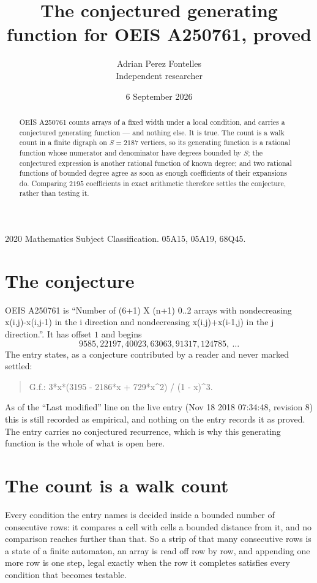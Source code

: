 \documentclass[11pt,a4paper]{article}
\title{The conjectured generating function for OEIS A250761, proved}
\author{Adrian Perez Fontelles\\ \small Independent researcher}
\date{6 September 2026}
\theoremstyle{plain}
\theoremstyle{definition}
\begin{document}
\maketitle

\begin{abstract}
OEIS A250761 counts arrays of a fixed width under a local condition, and carries a conjectured
generating function --- and nothing else. It is true. The count is a walk count in a finite
digraph on $S=2187$ vertices, so its generating function is a rational function whose numerator
and denominator have degrees bounded by $S$; the conjectured expression is another rational
function of known degree; and two rational functions of bounded degree agree as soon as enough
coefficients of their expansions do. Comparing $2195$ coefficients in exact arithmetic
therefore settles the conjecture, rather than testing it.
\end{abstract}

\noindent\small 2020 Mathematics Subject Classification. 05A15, 05A19, 68Q45.\normalsize

\section{The conjecture}

OEIS A250761 is ``Number of (6+1) X (n+1) 0..2 arrays with nondecreasing x(i,j)-x(i,j-1) in the i direction and nondecreasing x(i,j)+x(i-1,j) in the j direction.''. It has offset $1$ and begins
\[
9585, 22197, 40023, 63063, 91317, 124785,\ \dots
\]
The entry states, as a conjecture contributed by a reader and never marked settled:
\begin{quote}
G.f.: 3*x*(3195 - 2186*x + 729*x\^{}2) / (1 - x)\^{}3.
\end{quote}
As of the ``Last modified'' line on the live entry (Nov 18 2018 07:34:48, revision 8) this is still
recorded as empirical, and nothing on the entry records it as proved. The entry carries no
conjectured recurrence, which is why this generating function is the whole of what is open
here.

\section{The count is a walk count}

Every condition the entry names is decided inside a bounded number of consecutive rows: it
compares a cell with cells a bounded distance from it, and no comparison reaches further than
that. So a strip of that many consecutive rows is a state of a finite automaton, an array is
read off row by row, and appending one more row is one step, legal exactly when the row it
completes satisfies every condition that becomes testable.
\end{document}
